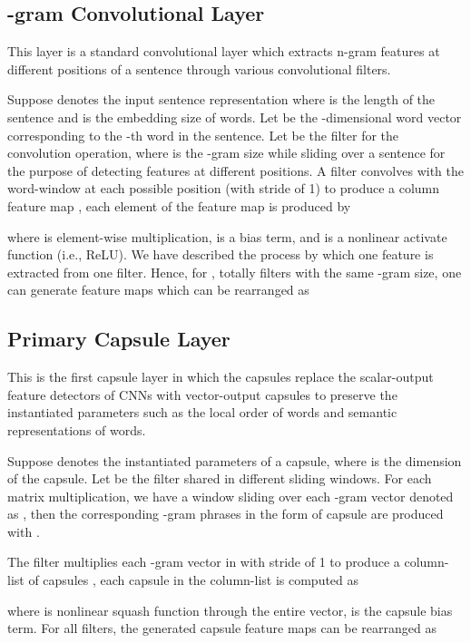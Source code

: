 \documentclass[11pt]{article}
\begin{document}
\subsection{-gram Convolutional Layer}
This layer is a standard convolutional layer which extracts n-gram features at different positions of a sentence through various convolutional filters.

Suppose  denotes the input sentence representation where  is the length of the sentence and  is the embedding size of words. Let  be the -dimensional word vector corresponding to the -th word in the sentence. Let  be the filter for the convolution operation, where  is the -gram size while sliding over a sentence for the purpose of detecting features at different positions. 
A filter  convolves with the word-window  at each possible position (with stride of 1) to produce a column feature map , each element  of the feature map is produced by

where  is element-wise multiplication,  is a bias term, and  is a nonlinear activate function (i.e., ReLU). We have described the process by which one
feature is extracted from one filter. Hence, for , totally 
filters with the same -gram size, one can generate  feature maps which can be rearranged as







\subsection{Primary Capsule Layer}
This is the first capsule layer in which the capsules replace the scalar-output feature detectors of CNNs with vector-output capsules to preserve the instantiated parameters such as the local order of words and semantic representations of words.




Suppose  denotes the instantiated parameters  of a capsule, where  is the dimension of the capsule. Let  be the filter shared in different sliding windows. For each matrix multiplication, we have a window sliding over each -gram vector denoted as , then the corresponding -gram phrases in the form of capsule are produced with . 

The filter  multiplies each -gram vector in  with stride of 1 to produce a column-list of capsules , each capsule  in the column-list is computed as 

where  is nonlinear squash function through the entire vector,  is the capsule bias term. For all  filters, the generated capsule feature maps can be rearranged as
\end{document}
